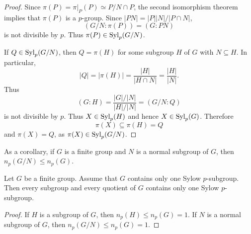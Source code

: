 \begin{proof}
    Since $\pi(P)=\pi|_{P}(P)\simeq P/N\cap P$,
    the second isomorphism theorem 
    implies that 
    $\pi(P)$ is a $p$-group. Since
    $|PN|=|P||N|/|P\cap N|$,
        \[
                (G/N:\pi(P))=(G:PN)
        \]
        is not divisible by $p$. Thus $\pi(P)\in\mathrm{Syl}_p(G/N)$.

        If $Q\in\mathrm{Syl}_p(G/N)$, then $Q=\pi(H)$ for some
        subgroup $H$ of $G$
        with $N\subseteq H$. In particular,
        \[
                |Q|=|\pi(H)|=\frac{|H|}{|H\cap N|}=\frac{|H|}{|N|}.
        \]
        Thus 
        \[
                (G:H)=\frac{|G|/|N|}{|H|/|N|}=(G/N:Q)
        \]
        is not divisible by $p$. Thus $X\in\mathrm{Syl}_p(H)$ and
        hence   
        $X\in\mathrm{Syl}_p(G)$. Therefore   
        \[
        \pi(X)\subseteq\pi(H)=Q
        \]
        and 
        $\pi(X)=Q$, as 
        $\pi(X)\in\mathrm{Syl}_p(G/N)$.
\end{proof}

As a corollary, if $G$ is a finite group and
$N$ is a normal subgroup of $G$, then 
$n_p(G/N)\leq n_p(G)$.

\begin{corollary}
Let $G$ be a finite group. Assume that 
$G$ contains only one Sylow $p$-subgroup. Then
every subgroup and every quotient of 
$G$ 
contains only one Sylow 
$p$-subgroup. 
\end{corollary}

\begin{proof}
    If $H$ is a subgroup of $G$, then
    $n_p(H)\leq n_p(G)=1$. If $N$ is a normal subgroup of 
    $G$, then $n_p(G/N)\leq n_p(G)=1$.
\end{proof}

%
%
